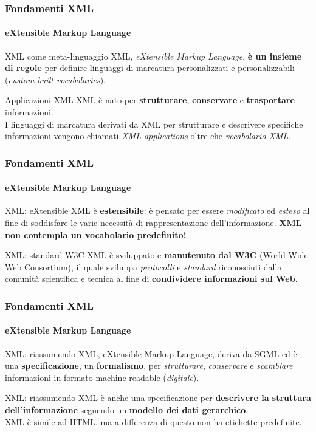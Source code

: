 \begin{frame}
	\frametitle{Fondamenti XML}
	\framesubtitle{eXtensible Markup Language}
	\addtocounter{nframe}{1}

	\begin{block}{XML come meta-linguaggio}
		XML, \textit{eXtensible Markup Language}, \textbf{è un insieme di regole} per definire linguaggi di marcatura personalizzati e personalizzabili (\textit{custom-built vocabolaries}).
	\end{block}

	\begin{block} {Applicazioni XML}
		XML è nato per \textbf{strutturare}, \textbf{conservare} e \textbf{trasportare} informazioni.
		\\ I linguaggi di marcatura derivati da XML per strutturare e descrivere specifiche informazioni vengono chiamati \textit{XML applications} oltre che \textit{vocabolario XML}.
	\end{block}
\end{frame}

\begin{frame}
	\frametitle{Fondamenti XML}
	\framesubtitle{eXtensible Markup Language}
	\addtocounter{nframe}{1}

	\begin{block}{XML: eXtensible}
		XML è \textbf{estensibile}: è pensato per essere \textit{modificato} ed \textit{esteso} al fine di soddisfare le varie necessità di rappresentazione dell'informazione.
		\textbf{XML non contempla un vocabolario predefinito!}
	\end{block}

	\begin{block} {XML: standard W3C}
		XML è sviluppato e \textbf{manutenuto dal W3C} (World Wide Web Consortium), il quale sviluppa \textit{protocolli} e \textit{standard} riconosciuti dalla comunità scientifica e tecnica al fine di \textbf{condividere informazioni sul Web}.
	\end{block}
\end{frame}

\begin{frame}
	\frametitle{Fondamenti XML}
	\framesubtitle{eXtensible Markup Language}
	\addtocounter{nframe}{1}

	\begin{block}{XML: riassumendo}
		XML, eXtensible Markup Language, deriva da SGML ed 
		è una \textbf{specificazione}, un \textbf{formalismo}, per \textit{strutturare}, \textit{conservare} e \textit{scambiare} informazioni in formato machine readable (\textit{digitale}).
	\end{block}

	\begin{block}{XML: riassumendo}
		XML è anche una specificazione per \textbf{descrivere la struttura dell'informazione} seguendo un \textbf{modello dei dati gerarchico}.
		\\ XML è simile ad HTML, ma a differenza di questo non ha etichette predefinite.
	\end{block}

\end{frame}


